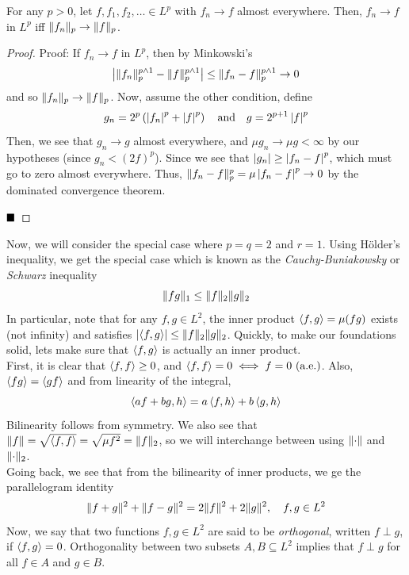 \begin{lemma}
    For any $p > 0$, let $f, f_1, f_2, \ldots \in L^{p}$ with $f_n \to f$ almost everywhere. Then, $f_n \to f$ in $L^{p}$ iff $\lVert {f_n} \rVert_{p} \to \lVert {f} \rVert_{p}$.
\end{lemma}
\begin{proof}{Proof:}
    If $f_n \to f$ in $L^{p}$, then by Minkowski's
    \[ \left\lvert {\lVert {f_n} \rVert_{p}^{p \wedge 1} - \lVert {f} \rVert_{p}^{p \wedge 1}} \right\rvert \leq \lVert {f_n - f} \rVert_{p}^{p \wedge 1} \to 0 \]
    and so $\lVert {f_n} \rVert_{p} \to \lVert {f} \rVert_{p}$. Now, assume the other condition, define
    \[ g_{n} = 2^{p}\left(\left\lvert {f_n} \right\rvert^{p} + \left\lvert {f} \right\rvert^{p}\right) \quad \text{and} \quad g = 2^{p + 1}\left\lvert {f} \right\rvert^{p} \]
    Then, we see that $g_n \to g$ almost everywhere, and $\mu g_n \to \mu g < \infty$  by our hypotheses (since $g_n < (2f)^{p}$). Since we see that $\left\lvert {g_n} \right\rvert \geq \left\lvert {f_n - f} \right\rvert^{p}$, which must go to zero almost everywhere. Thus, $\lVert {f_n - f} \rVert_{p}^{p} = \mu \left\lvert {f_n - f} \right\rvert^{p} \to 0$ by the dominated convergence theorem.
    
    $\qed$
\end{proof}

Now, we will consider the special case where $p = q = 2$ and $r = 1$. Using H\"older's inequality, we get the special case which is known as the \emph{Cauchy-Buniakowsky} or \emph{Schwarz} inequality
\[ \lVert {fg} \rVert_{1} \leq \lVert {f} \rVert_{2}\lVert {g} \rVert_{2} \]
In particular, note that for any $f, g \in L^{2}$, the inner product $\left\langle {f, g} \right\rangle = \mu(fg)$ exists (not infinity) and satisfies $\left\lvert {\left\langle {f, g} \right\rangle} \right\rvert \leq \lVert {f} \rVert_{2}\lVert {g} \rVert_{2}$. Quickly, to make our foundations solid, lets make sure that $\left\langle {f, g} \right\rangle$ is actually an inner product.\\

First, it is clear that $\left\langle {f, f} \right\rangle \geq 0$, and $\brac{f, f} = 0 \iff f = 0\ (\tt{a.e.})$. Also, $\left\langle {fg} \right\rangle = \left\langle {gf} \right\rangle$ and from linearity of the integral,
\[ \left\langle {af + bg, h} \right\rangle = a\left\langle {f, h} \right\rangle + b\left\langle {g, h} \right\rangle \]
Bilinearity follows from symmetry. We also see that $\lVert {f} \rVert = \sqrt{\left\langle {f, f} \right\rangle} = \sqrt{\mu f^2} = \lVert {f} \rVert_{2}$, so we will interchange between using $\lVert {\cdot} \rVert$ and $\lVert {\cdot} \rVert_{2}$. \\


Going back, we see that from the bilinearity of inner products, we ge the parallelogram identity
\[ \lVert {f + g} \rVert^2 + \lVert {f - g} \rVert^2 = 2\lVert {f} \rVert^2 + 2\lVert {g} \rVert^2,\quad f, g \in L^2 \]
Now, we say that two functions $f, g \in L^2$ are said to be \emph{orthogonal}, written $f \perp g$, if $\left\langle {f, g} \right\rangle = 0$. Orthogonality between two subsets $A, B \subseteq L^2$ implies that $f \perp g$ for all $f \in A$ and $g \in B$.\\

